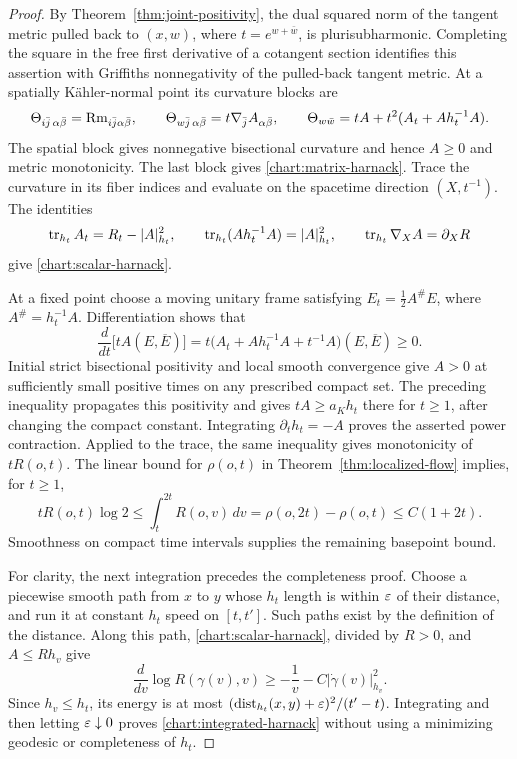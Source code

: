 \begin{proof}
By Theorem~\ref{thm:joint-positivity}, the dual squared norm of the
tangent metric pulled back to $(x,w)$, where $t=e^{w+\bar w}$, is
plurisubharmonic.  Completing the square in the free first derivative
of a cotangent section identifies this assertion with Griffiths
nonnegativity of the pulled-back tangent metric.  At a spatially
K\"ahler-normal point its curvature blocks are
\[
 \Theta_{i\bar j\,\alpha\bar\beta}
   =\operatorname{Rm}_{i\bar j\alpha\bar\beta},\qquad
 \Theta_{w\bar j\,\alpha\bar\beta}
   =t\nabla_{\bar j}A_{\alpha\bar\beta},\qquad
 \Theta_{w\bar w}=tA+t^2(A_t+A h_t^{-1}A).
\]
The spatial block gives nonnegative bisectional curvature and hence
$A\ge0$ and metric monotonicity.  The last block gives
\eqref{chart:matrix-harnack}.  Trace the curvature in its fiber
indices and evaluate on the spacetime direction $(X,t^{-1})$.
The identities
\[
 \operatorname{tr}_{h_t}A_t=R_t-|A|_{h_t}^2,
 \qquad \operatorname{tr}_{h_t}(A h_t^{-1}A)=|A|_{h_t}^2,
 \qquad \operatorname{tr}_{h_t}\nabla_X A=\partial_XR
\]
give \eqref{chart:scalar-harnack}.

At a fixed point choose a moving unitary frame satisfying
$E_t=\tfrac12 A^{\#}E$, where $A^{\#}=h_t^{-1}A$.
Differentiation shows that
\[
 \frac{d}{dt}\bigl[tA(E,\overline E)\bigr]
   =t\bigl(A_t+A h_t^{-1}A+t^{-1}A\bigr)(E,\overline E)\ge0.
\]
Initial strict bisectional positivity and local smooth convergence
give $A>0$ at sufficiently small positive times on any prescribed
compact set.  The preceding inequality propagates this positivity
and gives $tA\ge a_Kh_t$ there for $t\ge1$, after changing the compact
constant.  Integrating $\partial_t h_t=-A$ proves the asserted
power contraction.  Applied to the trace, the same inequality gives
monotonicity of $tR(o,t)$.  The linear bound for $\rho(o,t)$ in
Theorem~\ref{thm:localized-flow} implies, for $t\ge1$,
\[
 tR(o,t)\log2
 \le\int_t^{2t}R(o,v)\,dv
 =\rho(o,2t)-\rho(o,t)\le C(1+2t).
\]
Smoothness on compact time intervals supplies the remaining
basepoint bound.

For clarity, the next integration precedes the completeness proof.
Choose a piecewise smooth path from $x$ to $y$ whose $h_t$ length is
within $\varepsilon$ of their distance, and run it at constant $h_t$ speed
on $[t,t']$.  Such paths exist by the definition of the distance.
Along this path, \eqref{chart:scalar-harnack}, divided by $R>0$,
and $A\le Rh_v$ give
\[
 \frac{d}{dv}\log R(\gamma(v),v)
 \ge-\frac1v-C|\dot\gamma(v)|_{h_v}^2.
\]
Since $h_v\le h_t$, its energy is at most
$(\operatorname{dist}_{h_t}(x,y)+\varepsilon)^2/(t'-t)$.  Integrating and then letting
$\varepsilon\downarrow0$ proves \eqref{chart:integrated-harnack} without
using a minimizing geodesic or completeness of $h_t$.


\end{proof}
